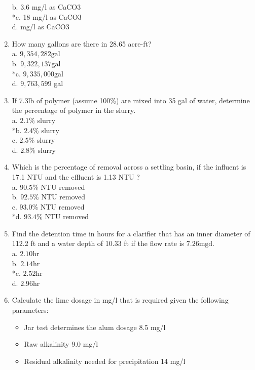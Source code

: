 \begin{enumerate}
b. 3.6 mg/l as CaCO3\\
*c. 18 mg/l as CaCO3\\
d. mg/l as CaCO3\\
\item How many gallons are there in 28.65 acre-ft?\\
a. $9,354,282 \mathrm{gal}$\\
b. $9,322,137 \mathrm{gal}$\\
*c. $9,335,000 \mathrm{gal}$\\
d. $9,763,599$ gal\\
\item If $7.3 \mathrm{lb}$ of polymer (assume 100\%) are mixed into 35 gal of water, determine the percentage of polymer in the slurry.\\
a. $2.1 \%$ slurry\\
*b. $2.4 \%$ slurry\\
c. $2.5 \%$ slurry\\
d. $2.8 \%$ slurry\\
\item Which is the percentage of removal across a settling basin, if the influent is 17.1 NTU and the effluent is 1.13 NTU ?\\
a. $90.5 \%$ NTU removed\\
b. $92.5 \%$ NTU removed\\
c. $93.0 \%$ NTU removed\\
*d. $93.4 \%$ NTU removed\\
\item Find the detention time in hours for a clarifier that has an inner diameter of 112.2 ft and a water depth of 10.33 ft if the flow rate is $7.26 \mathrm{mgd}$.\\
a. $2.10 \mathrm{hr}$\\
b. $2.14 \mathrm{hr}$\\
*c. $2.52 \mathrm{hr}$\\
d. $2.96 \mathrm{hr}$ \\
\item Calculate the lime dosage in mg/l that is required given the following parameters:\\
\begin{itemize}
\item Jar test determines the alum dosage 8.5 mg/l\\
\item Raw alkalinity 9.0 mg/l\\
\item Residual alkalinity needed for precipitation 14 mg/l\\

\end{itemize}
\end{enumerate}
